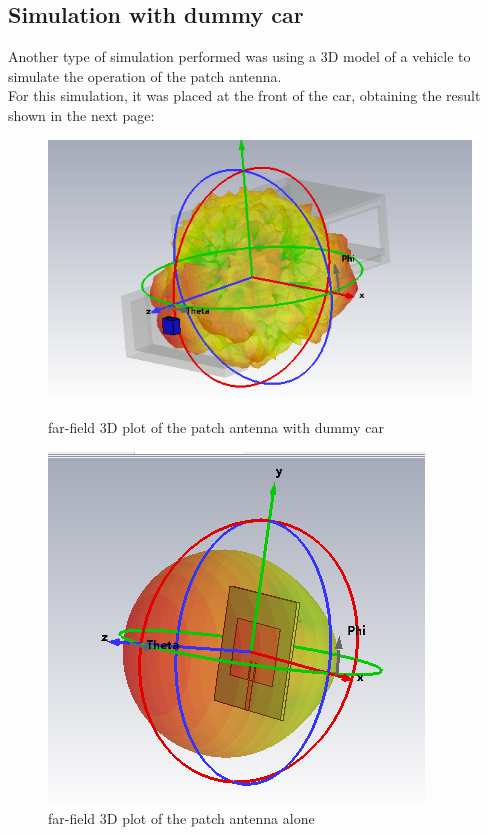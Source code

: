 \documentclass[]{article}
\begin{document}
\subsection{Simulation with dummy car}
Another type of simulation performed was using a 3D model of a vehicle to simulate the operation of the patch antenna.\\
For this simulation, it was placed at the front of the car, obtaining the result shown in the next page: 
\begin{figure}[H]
	\centering
	\begin{minipage}{0.41\linewidth}
		\centering
		\includegraphics[width=\linewidth]{img/3D_farfield_front_car}
		\caption{far-field 3D plot of the patch antenna with dummy car }
		\label{3Ddummycar}
	\end{minipage}\hspace{0.1\linewidth}
	\begin{minipage}{0.40\linewidth}
		\centering
		\includegraphics[width=\linewidth]{img/3d_farfield_patchsolo}
		\caption{far-field 3D plot of the patch antenna alone}
		\label{3Dpatch}
	\end{minipage}
\end{figure}
\end{document}
